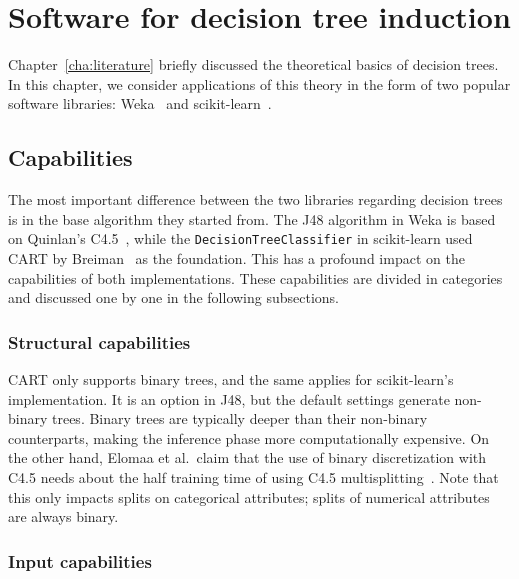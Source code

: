 \chapter{Software for decision tree induction}\label{cha:software}
Chapter~\ref{cha:literature} briefly discussed the theoretical basics of decision trees. In this chapter, we consider applications of this theory in the form of two popular software libraries: Weka~\cite{eibe2016weka} and scikit-learn~\cite{scikit-learn}.

\section{Capabilities}
The most important difference between the two libraries regarding decision trees is in the base algorithm they started from. The J48 algorithm in Weka is based on Quinlan's C4.5~\cite{c45}, while the \texttt{DecisionTreeClassifier} in scikit-learn used CART by Breiman~\cite{cart} as the foundation. This has a profound impact on the capabilities of both implementations. These capabilities are divided in categories and discussed one by one in the following subsections.

\subsection{Structural capabilities}
CART only supports binary trees, and the same applies for scikit-learn's implementation. It is an option in J48, but the default settings generate non-binary trees. Binary trees are typically deeper than their non-binary counterparts, making the inference phase more computationally expensive. On the other hand, Elomaa et al.\ claim that the use of binary discretization with C4.5 needs about the half training time of using C4.5 multisplitting~\cite{elomaa1999general}. Note that this only impacts splits on categorical attributes; splits of numerical attributes are always binary.

\subsection{Input capabilities}
